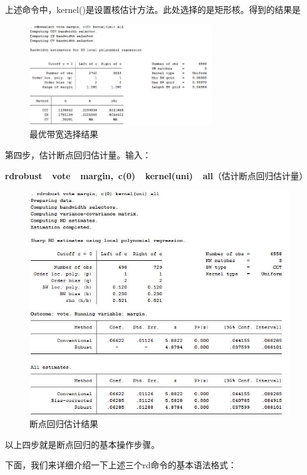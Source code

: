 \documentclass[cn,12pt,math=newtx,citestyle=gb7714-2015,bibstyle=gb7714-2015]{elegantbook}
\begin{document}
	上述命令中，kernel()是设置核估计方法。此处选择的是矩形核。得到的结果是
	
	\begin{figure}[htbp]
		\centering
		\includegraphics[width=0.7\textwidth]{rdbw.jpg}
		\caption{最优带宽选择结果}\label{fig:digit}
	\end{figure}
	
	第四步，估计断点回归估计量。输入：
	
	\textbf{rdrobust~~vote~~margin,~c(0)~~kernel(uni)~~all}（估计断点回归估计量）
	
	\begin{figure}[htbp]
		\centering
		\includegraphics[width=1\textwidth]{rdresults.jpg}
		\caption{断点回归估计结果}\label{fig:digit}
	\end{figure}
	
	以上四步就是断点回归的基本操作步骤。
	
	下面，我们来详细介绍一下上述三个rd命令的基本语法格式：
	
\end{document}

